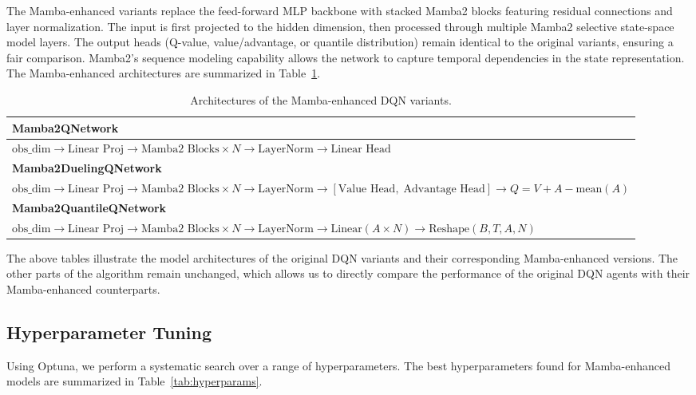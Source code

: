 \documentclass[conference]{IEEEtran}
\begin{document}
The Mamba-enhanced variants replace the feed-forward MLP backbone with stacked Mamba2 blocks featuring residual connections and layer normalization. The input is first projected to the hidden dimension, then processed through multiple Mamba2 selective state-space model layers. The output heads (Q-value, value/advantage, or quantile distribution) remain identical to the original variants, ensuring a fair comparison. Mamba2's sequence modeling capability allows the network to capture temporal dependencies in the state representation. The Mamba-enhanced architectures are summarized in Table~\ref{tab:mamba_arch}.

\begin{table}[H]
\centering
\caption{Architectures of the Mamba-enhanced DQN variants.}
\label{tab:mamba_arch}
\small
\begin{tabular}{@{}p{}@{}}
\toprule
\textbf{Mamba2QNetwork} \\
\midrule
$\text{obs\_dim} \rightarrow \text{Linear Proj} \rightarrow \text{Mamba2 Blocks} \times N \rightarrow \text{LayerNorm} \rightarrow \text{Linear Head}$ \\
\midrule
\textbf{Mamba2DuelingQNetwork} \\
\midrule
$\text{obs\_dim} \rightarrow \text{Linear Proj} \rightarrow \text{Mamba2 Blocks} \times N \rightarrow \text{LayerNorm} \rightarrow [\text{Value Head},\; \text{Advantage Head}] \rightarrow Q = V + A - \text{mean}(A)$ \\
\midrule
\textbf{Mamba2QuantileQNetwork} \\
\midrule
$\text{obs\_dim} \rightarrow \text{Linear Proj} \rightarrow \text{Mamba2 Blocks} \times N \rightarrow \text{LayerNorm} \rightarrow \text{Linear}(A \times N) \rightarrow \text{Reshape}(B, T, A, N)$ \\
\bottomrule
\end{tabular}
\end{table}

The above tables illustrate the model architectures of the original DQN variants and their corresponding Mamba-enhanced versions. The other parts of the algorithm remain unchanged, which allows us to directly compare the performance of the original DQN agents with their Mamba-enhanced counterparts.

\subsection{Hyperparameter Tuning}

Using Optuna, we perform a systematic search over a range of hyperparameters. The best hyperparameters found for Mamba-enhanced models are summarized in Table~\ref{tab:hyperparams}.
\end{document}

